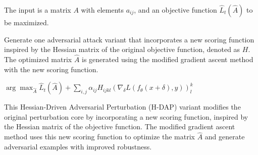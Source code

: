 The input is a matrix \(A\) with elements \(a_{ij}\), and an objective function \(\hat{L}_t(\hat{A})\) to be maximized.

Generate one adversarial attack variant that incorporates a new scoring function inspired by the Hessian matrix of the original objective function, denoted as \(H\). The optimized matrix \(\hat{A}\) is generated using the modified gradient ascent method with the new scoring function.

$\arg \max_{\hat{A}} \hat{L}_t(\hat{A}) + \sum_{i,j} \alpha_{ij} H_{ijkl} (\nabla_\delta L(f_\theta(x + \delta), y))^k_l$

This Hessian-Driven Adversarial Perturbation (H-DAP) variant modifies the original perturbation core by incorporating a new scoring function, inspired by the Hessian matrix of the objective function. The modified gradient ascent method uses this new scoring function to optimize the matrix $\hat{A}$ and generate adversarial examples with improved robustness.